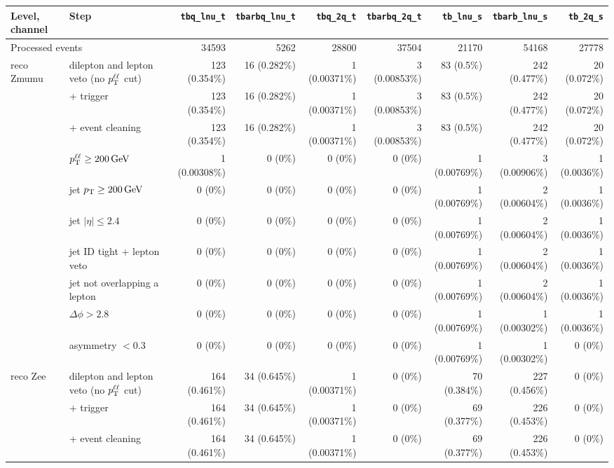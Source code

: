 \begin{tabular}{llrrrrrrr}
\toprule
Level, channel & Step & \texttt{tbq\_lnu\_t} & \texttt{tbarbq\_lnu\_t} & \texttt{tbq\_2q\_t} & \texttt{tbarbq\_2q\_t} & \texttt{tb\_lnu\_s} & \texttt{tbarb\_lnu\_s} & \texttt{tb\_2q\_s} \\
\midrule
\multicolumn{2}{l}{Processed events} & 34593 & 5262 & 28800 & 37504 & 21170 & 54168 & 27778 \\
\midrule
reco Zmumu & dilepton and lepton veto (no $p_{\mathrm{T}}^{\ell\ell}$ cut) & 123 (0.354\%) & 16 (0.282\%) & 1 (0.00371\%) & 3 (0.00853\%) & 83 (0.5\%) & 242 (0.477\%) & 20 (0.072\%) \\
 & + trigger & 123 (0.354\%) & 16 (0.282\%) & 1 (0.00371\%) & 3 (0.00853\%) & 83 (0.5\%) & 242 (0.477\%) & 20 (0.072\%) \\
 & + event cleaning & 123 (0.354\%) & 16 (0.282\%) & 1 (0.00371\%) & 3 (0.00853\%) & 83 (0.5\%) & 242 (0.477\%) & 20 (0.072\%) \\
 & $p_{\mathrm{T}}^{\ell\ell} \geq 200\,\mathrm{GeV}$ & 1 (0.00308\%) & 0 (0\%) & 0 (0\%) & 0 (0\%) & 1 (0.00769\%) & 3 (0.00906\%) & 1 (0.0036\%) \\
 & jet $p_{\mathrm{T}} \geq 200\,\mathrm{GeV}$ & 0 (0\%) & 0 (0\%) & 0 (0\%) & 0 (0\%) & 1 (0.00769\%) & 2 (0.00604\%) & 1 (0.0036\%) \\
 & jet $|\eta| \leq 2.4$ & 0 (0\%) & 0 (0\%) & 0 (0\%) & 0 (0\%) & 1 (0.00769\%) & 2 (0.00604\%) & 1 (0.0036\%) \\
 & jet ID tight + lepton veto & 0 (0\%) & 0 (0\%) & 0 (0\%) & 0 (0\%) & 1 (0.00769\%) & 2 (0.00604\%) & 1 (0.0036\%) \\
 & jet not overlapping a lepton & 0 (0\%) & 0 (0\%) & 0 (0\%) & 0 (0\%) & 1 (0.00769\%) & 2 (0.00604\%) & 1 (0.0036\%) \\
 & $\Delta\phi > 2.8$ & 0 (0\%) & 0 (0\%) & 0 (0\%) & 0 (0\%) & 1 (0.00769\%) & 1 (0.00302\%) & 1 (0.0036\%) \\
 & asymmetry $< 0.3$ & 0 (0\%) & 0 (0\%) & 0 (0\%) & 0 (0\%) & 1 (0.00769\%) & 1 (0.00302\%) & 0 (0\%) \\
\midrule
reco Zee & dilepton and lepton veto (no $p_{\mathrm{T}}^{\ell\ell}$ cut) & 164 (0.461\%) & 34 (0.645\%) & 1 (0.00371\%) & 0 (0\%) & 70 (0.384\%) & 227 (0.456\%) & 0 (0\%) \\
 & + trigger & 164 (0.461\%) & 34 (0.645\%) & 1 (0.00371\%) & 0 (0\%) & 69 (0.377\%) & 226 (0.453\%) & 0 (0\%) \\
 & + event cleaning & 164 (0.461\%) & 34 (0.645\%) & 1 (0.00371\%) & 0 (0\%) & 69 (0.377\%) & 226 (0.453\%) & 0 (0\%) \\

\end{tabular}
